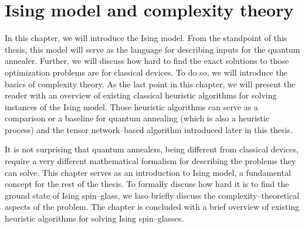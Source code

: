 \chapter{Ising model and complexity theory}

In this chapter, we will introduce the Ising model. From the standpoint of this thesis, this model
will serve as the language for describing inputs for the quantum annealer. Further, we will discuss
how hard to find the exact solutions to those optimization problems are for classical devices. To do
so, we will introduce the basics of complexity theory. As the last point in this chapter, we will
present the reader with an overview of existing classical heuristic algorithms for solving instances
of the Ising model. Those heuristic algorithms can serve as a comparison or a baseline for quantum
annealing (which is also a heuristic process) and the tensor network--based algorithm introduced
later in this thesis.



It is not surprising that quantum annealers, being different from classical devices, require
a very different mathematical formalism for describing the problems they can solve.
This chapter serves as an introduction to Ising model, a fundamental concept for the rest of the thesis. To formally discuss how hard it is to find the ground state of Ising spin--glass, we laso briefly discuss the complexity--theoretical aspects of the problem. The chapter is concluded with a brief overview of existing heuristic algorithms for solving Ising spin--glasses.

